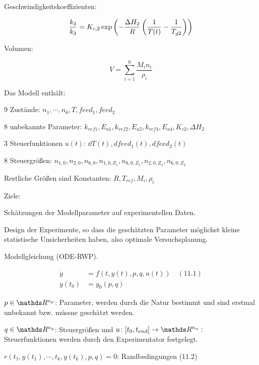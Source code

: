 Geschwindigkeitskoeffizienten:

\begin{align*}
\frac{k_2}{k_3} &= K_{c,2} \exp \left( - \frac{\Delta H_2}{R} \left( \frac{1}{T(t)} - \frac1{T_{g2}} \right) \right) \\
\end{align*}

Volumen:

\[ V = \sum\limits_{i=1}^6 \frac{M_i n_i}{\rho_i} \]

Das Modell enthält:

\bitm
\item 9 Zustände: $n_1, \cdots, n_6, T, feed_1, feed_2$
\item 8 unbekannte Parameter: $k_{ref1}, E_{a1}, k_{ref2}, E_{a2}, k_{ref4}, E_{a4}, K_{c2}, \Delta H_2$ 
\item 3 Steuerfunktionen $u(t)$: $\dd T(t), dfeed_1(t), dfeed_2(t)$
\item 8 Steuergrößen: $n_{1,0}, n_{2,0}, n_{6,0}, n_{1,0,Z_1}, n_{6,0, Z_1}, n_{2,0,Z_2},n_{6,0,Z_2}$
\item Restliche Größen sind Konstanten: $R, T_{ref}, M_i, \rho_i$
\eitm

Ziele:

\bitm
\item Schätzungen der Modellparameter auf experimentellen Daten.
\item Design der Experimente, so dass die geschätzten Parameter möglichst kleine statistische Unsicherheiten haben, also optimale Versuchsplanung.
\eitm


Modellgleichung (\obda ODE-RWP).

\begin{align*}
\dot y &= f(t,y(t),p,q,u(t)) \quad (11.1) \\
y(t_0) &= y_0(p,q) 
\end{align*}

\bitm
\item $p \in \R^{n_p}$: Parameter, werden durch die Natur bestimmt und sind erstmal unbekannt bzw. müssne geschätzt werden.
\item $q \in \R^{n_q}$: Steuergrößen und $u\colon [\tn, \tend] \to \R^{n_u}:$ Steuerfunktionen werden durch den Experimentator festgelegt.
\item $r(t_1, y(t_1), \cdots, t_k, y(t_k), p, q) = 0$: Randbedingungen (11.2)
\eitm

